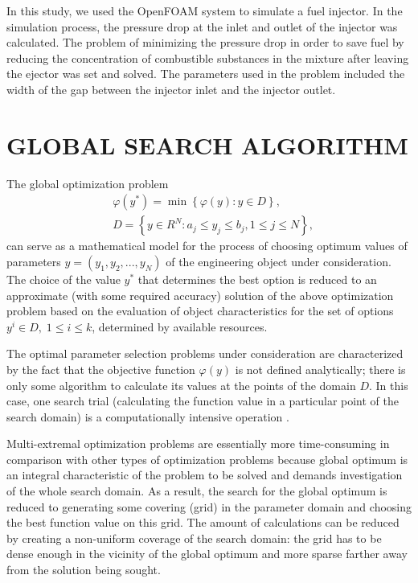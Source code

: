 \documentclass{aip-cp}
\begin{document}
In this study, we used the OpenFOAM system to simulate a fuel injector. In the simulation process, the pressure drop at the inlet and outlet of the injector was calculated. The problem of minimizing the pressure drop in order to save fuel by reducing the concentration of combustible substances in the mixture after leaving the ejector was set and solved. The parameters used in the problem included the width of the gap between the injector inlet and the injector outlet.

\section{GLOBAL SEARCH ALGORITHM}


The global optimization problem
\begin{eqnarray}\label{problem}
&\varphi(y^\ast)=\min{\left\{\varphi(y):y\in D\right\}},\\
&D=\left\{y\in R^N: a_j\leq y_j \leq b_j, 1\leq j \leq N \right\},\label{D}
\end{eqnarray}
can serve as a mathematical model for the process of choosing optimum values of parameters $y=(y_1,y_2,...,y_N)$ of the engineering object under consideration.
The choice of the value  $y^*$ that determines the best option  is reduced to an approximate (with some required accuracy) solution of the above optimization problem based on the evaluation of object characteristics for the set of options $y^i\in D, \; 1 \leq i \leq k$, determined by available resources.

The optimal parameter selection problems under consideration are characterized by the fact that the objective function $\varphi(y)$ is not defined analytically; there is only some algorithm to calculate its values at the points of the domain $D$.  In this case, one search trial (calculating the function value in a particular point of the search domain) is a computationally intensive operation \cite{Kalyulin2017}.

Multi-extremal optimization problems are essentially more time-consuming in comparison with other types of optimization problems because global optimum is an integral characteristic of the problem to be solved and demands investigation of the whole search domain. As a result, the search for the global optimum is reduced to generating  some covering (grid) in the parameter domain and choosing the best function value on this grid. The amount of calculations can be reduced by creating a non-uniform coverage of the search domain: the grid has to be dense enough in the vicinity of the global optimum and more sparse farther away from the solution being sought.
\end{document}
